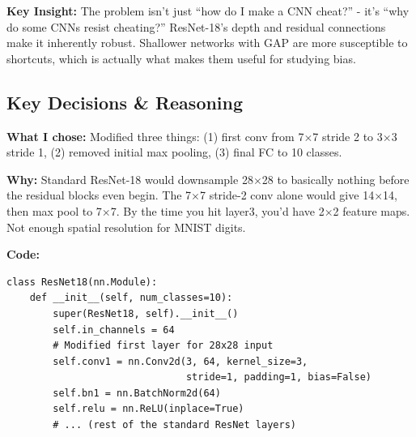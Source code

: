 \documentclass[9pt,a4paper,twocolumn,twoside]{tau-class/tau}
\begin{document}
        \begin{note}
            \textbf{Key Insight:} The problem isn't just ``how do I make a CNN cheat?'' - it's ``why do some CNNs resist cheating?'' ResNet-18's depth and residual connections make it inherently robust. Shallower networks with GAP are more susceptible to shortcuts, which is actually what makes them useful for studying bias.
        \end{note}

    \subsection{Key Decisions \& Reasoning}

        \begin{tauenv}[frametitle=Decision: Adapt ResNet-18 for 28$\times$28 Input]
            \textbf{What I chose:} Modified three things: (1) first conv from 7$\times$7 stride 2 to 3$\times$3 stride 1, (2) removed initial max pooling, (3) final FC to 10 classes.

            \textbf{Why:} Standard ResNet-18 would downsample 28$\times$28 to basically nothing before the residual blocks even begin. The 7$\times$7 stride-2 conv alone would give 14$\times$14, then max pool to 7$\times$7. By the time you hit layer3, you'd have 2$\times$2 feature maps. Not enough spatial resolution for MNIST digits.

            \textbf{Code:}
            \begin{verbatim}
class ResNet18(nn.Module):
    def __init__(self, num_classes=10):
        super(ResNet18, self).__init__()
        self.in_channels = 64
        # Modified first layer for 28x28 input
        self.conv1 = nn.Conv2d(3, 64, kernel_size=3, 
                               stride=1, padding=1, bias=False)
        self.bn1 = nn.BatchNorm2d(64)
        self.relu = nn.ReLU(inplace=True)
        # ... (rest of the standard ResNet layers)
            \end{verbatim}
        \end{tauenv}
\end{document}
